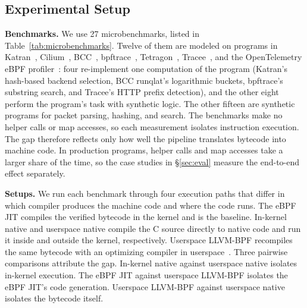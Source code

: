 \subsection{Experimental Setup}
\label{subsec:char-method}

\noindent\textbf{Benchmarks.}
We use 27 microbenchmarks, listed in Table~\ref{tab:microbenchmarks}.
Twelve of them are modeled on programs in Katran~\cite{katran}, Cilium~\cite{cilium}, BCC~\cite{bcc}, bpftrace~\cite{bpftrace}, Tetragon~\cite{tetragon}, Tracee~\cite{tracee}, and the OpenTelemetry eBPF profiler~\cite{otelprofiler}: four re-implement one computation of the program (Katran's hash-based backend selection, BCC runqlat's logarithmic buckets, bpftrace's substring search, and Tracee's HTTP prefix detection), and the other eight perform the program's task with synthetic logic. The other fifteen are synthetic programs for packet parsing, hashing, and search.
The benchmarks make no helper calls or map accesses, so each measurement isolates instruction execution.
The gap therefore reflects only how well the pipeline translates bytecode into machine code.
In production programs, helper calls and map accesses take a larger share of the time, so the case studies in \S\ref{sec:eval} measure the end-to-end effect separately.

\noindent\textbf{Setups.}
We run each benchmark through four execution paths that differ in which compiler produces the machine code and where the code runs.
The eBPF JIT compiles the verified bytecode in the kernel and is the baseline.
In-kernel native and userspace native compile the C source directly to native code and run it inside and outside the kernel, respectively.
Userspace LLVM-BPF recompiles the same bytecode with an optimizing compiler in userspace~\cite{zheng2025extending}.
Three pairwise comparisons attribute the gap.
In-kernel native against userspace native isolates in-kernel execution.
The eBPF JIT against userspace LLVM-BPF isolates the eBPF JIT's code generation.
Userspace LLVM-BPF against userspace native isolates the bytecode itself.

